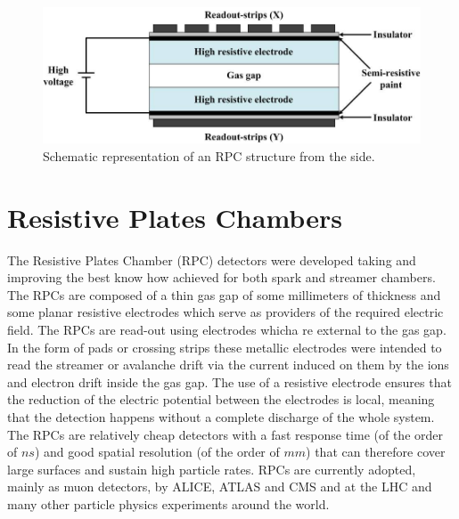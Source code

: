 \begin{figure}[!t]
\begin{center}
\includegraphics[width=0.8\linewidth]{Chapters/Performance/Figs/RPCside.png}
\caption{Schematic representation of an RPC structure from the side.}
\label{fig:RPCside}
\end{center}
\end{figure}

\section{Resistive Plates Chambers}
The Resistive Plates Chamber (RPC) detectors were developed taking and improving the best know how achieved for both spark and streamer chambers.
The RPCs are composed of a thin gas gap of some millimeters of thickness and some planar resistive electrodes which serve as providers of the required electric field.
The RPCs are read-out using electrodes whicha re external to the gas gap.
In the form of pads or crossing strips these metallic electrodes were intended to read the streamer or avalanche drift via the current induced on them by the ions and electron drift inside the gas gap.
The use of a resistive electrode ensures that the reduction of the electric potential between the electrodes is local, meaning that the detection happens without a complete discharge of the whole system.
The RPCs are relatively cheap detectors with a fast response time (of the order of $ns$) and good spatial resolution (of the order of $mm$) that can therefore cover large surfaces and sustain high particle rates.
RPCs are currently adopted, mainly as muon detectors, by ALICE, ATLAS and CMS and at the LHC and many other particle physics experiments around the world.

